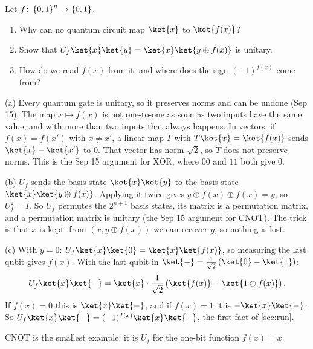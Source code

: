 \begin{exercisebox}
\begin{pproblem}\label{pp:uf}
    Let $f \colon \left\lbrace0,1\right\rbrace^n \to \left\lbrace0,1\right\rbrace$.
    \begin{enumerate}[label=(\alph*)]
        \item Why can no quantum circuit map $\ket{x}$ to $\ket{f(x)}$?
        \item Show that $U_f \ket{x}\ket{y} = \ket{x}\ket{y \oplus f(x)}$ is unitary.
        \item How do we read $f(x)$ from it, and where does the sign $(-1)^{f(x)}$ come from?
    \end{enumerate}
\end{pproblem}
\tcblower
\begin{wsolution}
    (a) Every quantum gate is unitary, so it preserves norms and can be undone (Sep 15). The map
    $x \mapsto f(x)$ is not one-to-one as soon as two inputs have the same value, and with more than
    two inputs that always happens. In vectors: if $f(x) = f(x')$ with $x \neq x'$, a linear map $T$
    with $T\ket{x} = \ket{f(x)}$ sends $\ket{x} - \ket{x'}$ to $0$. That vector has norm $\sqrt{2}$,
    so $T$ does not preserve norms. This is the Sep 15 argument for XOR, where $00$ and $11$ both
    give $0$.

    (b) $U_f$ sends the basis state $\ket{x}\ket{y}$ to the basis state
    $\ket{x}\ket{y \oplus f(x)}$. Applying it twice gives $y \oplus f(x) \oplus f(x) = y$, so
    $U_f^2 = I$. So $U_f$ permutes the $2^{n+1}$ basis states, its matrix is a permutation matrix,
    and a permutation matrix is unitary (the Sep 15 argument for CNOT). The trick is that $x$ is
    kept: from $(x, y \oplus f(x))$ we can recover $y$, so nothing is lost.

    (c) With $y = 0$: $U_f \ket{x}\ket{0} = \ket{x}\ket{f(x)}$, so measuring the last qubit gives
    $f(x)$. With the last qubit in $\ket{-} = \frac{1}{\sqrt{2}}\left(\ket{0} - \ket{1}\right)$:
    \[U_f \ket{x}\ket{-} = \ket{x} \cdot \frac{1}{\sqrt{2}}\left(\ket{f(x)} - \ket{1 \oplus f(x)}\right).\]
    If $f(x) = 0$ this is $\ket{x}\ket{-}$, and if $f(x) = 1$ it is $-\ket{x}\ket{-}$. So
    $U_f \ket{x}\ket{-} = (-1)^{f(x)} \ket{x}\ket{-}$, the first fact of \cref{sec:run}.

    CNOT is the smallest example: it is $U_f$ for the one-bit function $f(x) = x$.
\end{wsolution}
\end{exercisebox}

